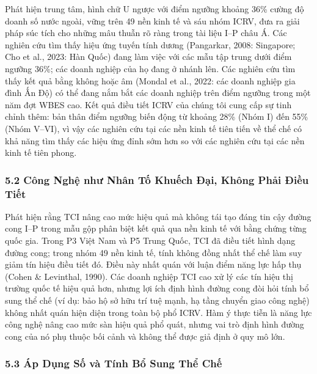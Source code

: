 \documentclass[12pt,a4paper]{article}
\begin{document}
Phát hiện trung tâm, hình chữ U ngược với điểm ngưỡng khoảng 36\% cường
độ doanh số nước ngoài, vững trên 49 nền kinh tế và sáu nhóm ICRV, đưa
ra giải pháp súc tích cho những mâu thuẫn rõ ràng trong tài liệu I--P
châu Á. Các nghiên cứu tìm thấy hiệu ứng tuyến tính dương (Pangarkar,
2008: Singapore; Cho et al., 2023: Hàn Quốc) đang làm việc với các mẫu
tập trung dưới điểm ngưỡng 36\%; các doanh nghiệp của họ đang ở nhánh
lên. Các nghiên cứu tìm thấy kết quả bằng không hoặc âm (Mondal et al.,
2022: các doanh nghiệp gia đình Ấn Độ) có thể đang nắm bắt các doanh
nghiệp trên điểm ngưỡng trong một năm đợt WBES cao. Kết quả điều tiết
ICRV của chúng tôi cung cấp sự tinh chỉnh thêm: bản thân điểm ngưỡng
biến động từ khoảng 28\% (Nhóm I) đến 55\% (Nhóm V--VI), vì vậy các
nghiên cứu tại các nền kinh tế tiên tiến về thể chế có khả năng tìm thấy
các hiệu ứng đỉnh sớm hơn so với các nghiên cứu tại các nền kinh tế tiên
phong.

\hypertarget{52-cuxf4ng-nghux1ec7-nhux1b0-nhuxe2n-tux1ed1-khuux1ebfch-ux111ux1ea1i-khuxf4ng-phux1ea3i-ux111iux1ec1u-tiux1ebft}{%
\subsubsection{5.2 Công Nghệ như Nhân Tố Khuếch Đại, Không Phải Điều
Tiết}\label{52-cuxf4ng-nghux1ec7-nhux1b0-nhuxe2n-tux1ed1-khuux1ebfch-ux111ux1ea1i-khuxf4ng-phux1ea3i-ux111iux1ec1u-tiux1ebft}}

Phát hiện rằng TCI nâng cao mức hiệu quả mà không tái tạo đáng tin cậy
đường cong I--P trong mẫu gộp phân biệt kết quả qua nền kinh tế với bằng
chứng từng quốc gia. Trong P3 Việt Nam và P5 Trung Quốc, TCI đã điều
tiết hình dạng đường cong; trong nhóm 49 nền kinh tế, tính không đồng
nhất thể chế làm suy giảm tín hiệu điều tiết đó. Điều này nhất quán với
luận điểm năng lực hấp thụ (Cohen \& Levinthal, 1990). Các doanh nghiệp
TCI cao xử lý các tín hiệu thị trường quốc tế hiệu quả hơn, nhưng lợi
ích định hình đường cong đòi hỏi tính bổ sung thể chế (ví dụ: bảo hộ sở
hữu trí tuệ mạnh, hạ tầng chuyển giao công nghệ) không nhất quán hiện
diện trong toàn bộ phổ ICRV. Hàm ý thực tiễn là năng lực công nghệ nâng
cao mức sàn hiệu quả phổ quát, nhưng vai trò định hình đường cong của nó
phụ thuộc bối cảnh và không thể được giả định ở quy mô lớn.

\hypertarget{53-uxe1p-dux1ee5ng-sux1ed1-vuxe0-tuxednh-bux1ed5-sung-thux1ec3-chux1ebf}{%
\subsubsection{5.3 Áp Dụng Số và Tính Bổ Sung Thể
Chế}\label{53-uxe1p-dux1ee5ng-sux1ed1-vuxe0-tuxednh-bux1ed5-sung-thux1ec3-chux1ebf}}
\end{document}
